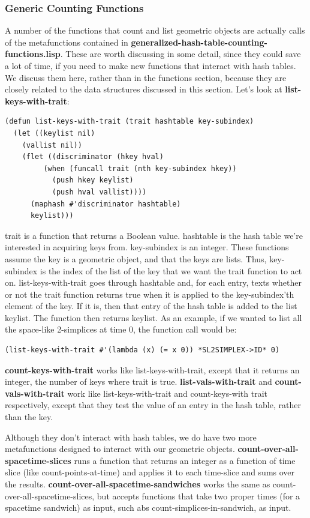 \message{ !name(programmers_guide.tex)}\documentclass[12pt]{article}
\begin{document}
\subsubsection{Generic Counting Functions}

A number of the functions that count and list geometric objects are
actually calls of the metafunctions contained in
\textbf{generalized-hash-table-counting-functions.lisp}. These are
worth discussing in some detail, since they could save a lot of time,
if you need to make new functions that interact with hash tables. We
discuss them here, rather than in the functions section, because they
are closely related to the data structures discussed in this
section. Let's look at \textbf{list-keys-with-trait}:
\begin{lstlisting}
(defun list-keys-with-trait (trait hashtable key-subindex)
  (let ((keylist nil)
	(vallist nil))
    (flet ((discriminator (hkey hval)
	     (when (funcall trait (nth key-subindex hkey))
	       (push hkey keylist)
	       (push hval vallist))))
      (maphash #'discriminator hashtable)
      keylist)))
\end{lstlisting}
trait is a function that returns a Boolean value. hashtable is the
hash table we're interested in acquiring keys from. key-subindex is an
integer. These functions assume the key is a geometric object, and
that the keys are lists. Thus, key-subindex is the index of the list
of the key that we want the trait function to act
on. list-keys-with-trait goes through hashtable and, for each entry,
texts whether or not the trait function returns true when it is
applied to the key-subindex'th element of the key. If it is, then that
entry of the hash table is added to the list keylist. The function
then returns keylist. As an example, if we wanted to list all the
space-like 2-simplices at time 0, the function call would be:
\begin{lstlisting}
(list-keys-with-trait #'(lambda (x) (= x 0)) *SL2SIMPLEX->ID* 0)
\end{lstlisting}

\textbf{count-keys-with-trait} works like list-keys-with-trait, except
that it returns an integer, the number of keys where trait is
true. \textbf{list-vals-with-trait} and \textbf{count-vals-with-trait}
work like list-keys-with-trait and count-keys-with trait respectively,
except that they test the value of an entry in the hash table, rather
than the key.

Although they don't interact with hash tables, we do have two more
metafunctions designed to interact with our geometric
objects. \textbf{count-over-all-spacetime-slices} runs a function that
returns an integer as a function of time slice (like
count-points-at-time) and applies it to each time-slice and sums over
the results. \textbf{count-over-all-spacetime-sandwiches} works the
same as count-over-all-spacetime-slices, but accepts functions that
take two proper times (for a spacetime sandwich) as input, such abs
count-simplices-in-sandwich, as input.
\end{document}
